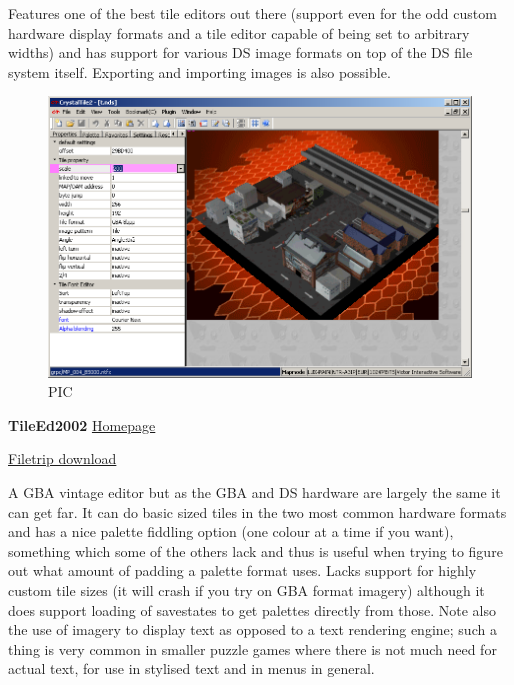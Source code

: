 \documentclass[
]{book}
\begin{document}
Features one of the best tile editors out there (support even for the odd custom hardware display formats and a tile editor capable of being set to arbitrary widths) and has support for various DS image formats on top of the DS file system itself. Exporting and importing images is also possible.

\begin{figure}
\centering
\includegraphics{images/12_home_fast6191_romhackingguide_unrenamed_file___kingguidetileeeditorsshowcasecrystaltile2_1.png}
\caption{PIC}
\end{figure}

\textbf{TileEd2002} \href{http://home.arcor.de/minako.aino/TilEd2002/}{Homepage}

\href{http://filetrip.net/gba-downloads/tools-utilities/download-tiled2002-064b-f7846.html}{Filetrip download}

A GBA vintage editor but as the GBA and DS hardware are largely the same it can get far. It can do basic sized tiles in the two most common hardware formats and has a nice palette fiddling option (one colour at a time if you want), something which some of the others lack and thus is useful when trying to figure out what amount of padding a palette format uses. Lacks support for highly custom tile sizes (it will crash if you try on GBA format imagery) although it does support loading of savestates to get palettes directly from those. Note also the use of imagery to display text as opposed to a text rendering engine; such a thing is very common in smaller puzzle games where there is not much need for actual text, for use in stylised text and in menus in general.
\end{document}
